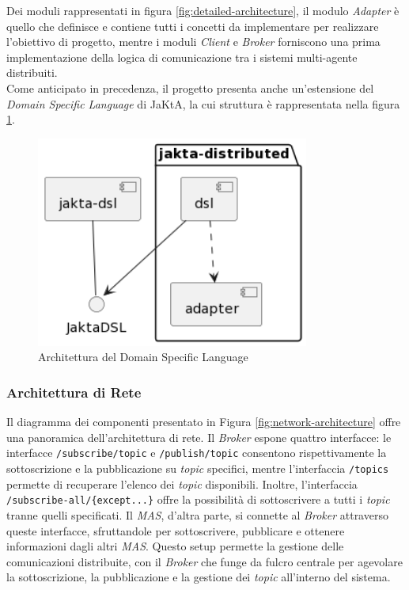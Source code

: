 Dei moduli rappresentati in figura \ref{fig:detailed-architecture}, il modulo \textit{Adapter} è quello che definisce e contiene tutti i concetti da implementare per realizzare l'obiettivo di progetto,
mentre i moduli \textit{Client} e \textit{Broker} forniscono una prima implementazione della logica di comunicazione tra i sistemi multi-agente distribuiti.\\

Come anticipato in precedenza, il progetto presenta anche un'estensione del \textit{Domain Specific Language} di JaKtA, la cui struttura è rappresentata nella figura \ref{fig:dsl-architecture}.

\begin{figure}[ht!]
    \centering
    \includegraphics[width=0.8\textwidth]{figures/dsl-architecture.png}
    \caption{Architettura del Domain Specific Language}
    \label{fig:dsl-architecture}
\end{figure}

\subsubsection{Architettura di Rete}

Il diagramma dei componenti presentato in Figura \ref{fig:network-architecture} offre una panoramica dell'architettura di rete.
Il \textit{Broker} espone quattro interfacce: le interfacce \texttt{/subscribe/{topic}} e \texttt{/publish/{topic}} consentono rispettivamente la sottoscrizione e la pubblicazione su \textit{topic} specifici, mentre l'interfaccia \texttt{/topics} permette di recuperare l'elenco dei \textit{topic} disponibili. Inoltre, l'interfaccia \texttt{/subscribe-all/\{except...\}} offre la possibilità di sottoscrivere a tutti i \textit{topic} tranne quelli specificati. Il \textit{MAS}, d'altra parte, si connette al \textit{Broker} attraverso queste interfacce, sfruttandole per sottoscrivere, pubblicare e ottenere informazioni dagli altri \textit{MAS}. Questo setup permette la gestione delle comunicazioni distribuite, con il \textit{Broker} che funge da fulcro centrale per agevolare la sottoscrizione, la pubblicazione e la gestione dei \textit{topic} all'interno del sistema.

